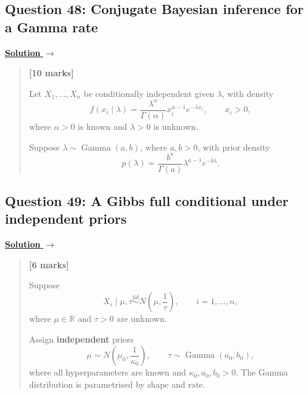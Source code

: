 \documentclass[11pt,a4paper]{article}
\newcommand{\given}{\mathrel{|}}
\newcommand{\xvec}{\boldsymbol{x}}
\newcommand{\E}{\mathbb{E}}
\newcommand{\partmarks}[1]{%
  \unskip\nobreak\hfill\penalty50\hskip1em\null\nobreak\hfill
  \mbox{\textbf{[#1]}}}
\newenvironment{examquestion}[2]
  {\subsection{#1}\label{question:\arabic{subsection}}\label{#2}%
   \noindent\hyperref[answer:\arabic{subsection}]{\textbf{Solution} $\rightarrow$}%
   \begin{quote}\color{statgrey}}
  {\end{quote}}
\begin{document}
\begin{examquestion}{Question 48: Conjugate Bayesian inference for a Gamma rate}{question:practice-conjugate-bayesian-inference-for-a-gamma-rate}
\textbf{[10 marks]}

Let $X_1,\ldots,X_n$ be conditionally independent given $\lambda$, with density
\[
f(x_i\given\lambda)
=\frac{\lambda^\alpha}{\Gamma(\alpha)}
x_i^{\alpha-1}e^{-\lambda x_i},\qquad x_i>0,
\]
where $\alpha>0$ is known and $\lambda>0$ is unknown.

Suppose $\lambda\sim\operatorname{Gamma}(a,b)$, where $a,b>0$, with prior
density
\[
p(\lambda)=\frac{b^a}{\Gamma(a)}\lambda^{a-1}e^{-b\lambda}.
\]
\end{examquestion}

\clearpage

\begin{examquestion}{Question 49: A Gibbs full conditional under independent priors}{question:practice-a-gibbs-full-conditional-under-independent-priors}
\textbf{[6 marks]}

Suppose
\[
X_i\given\mu,\tau\overset{\mathrm{iid}}{\sim}
N\!\left(\mu,\frac1\tau\right),\qquad i=1,\ldots,n,
\]
where $\mu\in\mathbb R$ and $\tau>0$ are unknown.

Assign \textbf{independent} priors
\[
\mu\sim N\!\left(\mu_0,\frac1{\kappa_0}\right),
\qquad \tau\sim\operatorname{Gamma}(a_0,b_0),
\]
where all hyperparameters are known and $\kappa_0,a_0,b_0>0$.
The Gamma distribution is parametrised by shape and rate.
\end{examquestion}
\end{document}
